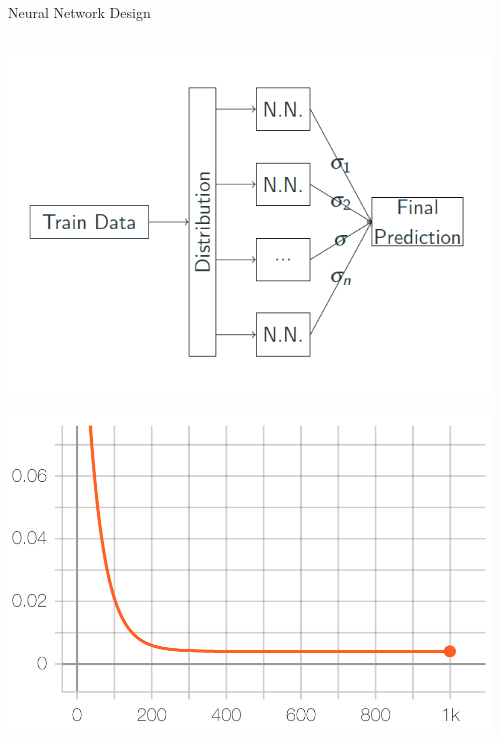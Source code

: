 \documentclass{beamer}
\begin{document}
\begin{frame}{Neural Network Design}
    \begin{columns}
    \begin{column}{0.5\textwidth}
        \begin{center}
              \includegraphics[width=0.8\linewidth]{GA_images/adaboost.png}
        \end{center}
        \begin{center}
              \includegraphics[width=0.8\linewidth]{GA_images/neural-network-train.png}
        \end{center}
    \end{column}
    \begin{column}{0.5\textwidth}
        \begin{center}

\end{center}
\end{column}
\end{columns}
\end{frame}
\end{document}
